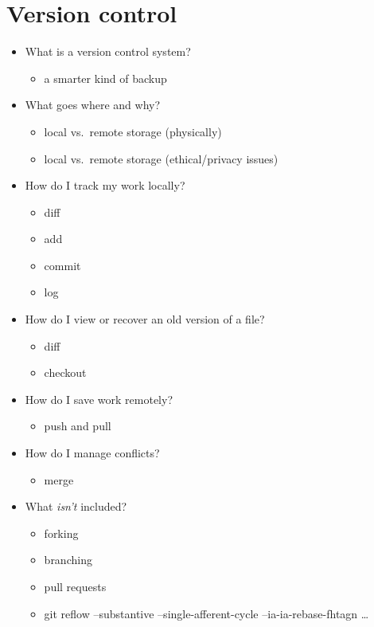 \documentclass[]{Nemilov}
\providecommand{\tightlist}{%
  \setlength{\itemsep}{0pt}\setlength{\parskip}{0pt}}
\begin{document}
\hypertarget{version-control}{%
\section{Version control}\label{version-control}}

\begin{itemize}
\tightlist
\item
  What is a version control system?

  \begin{itemize}
  \tightlist
  \item
    a smarter kind of backup
  \end{itemize}
\item
  What goes where and why?

  \begin{itemize}
  \tightlist
  \item
    local vs.~remote storage (physically)
  \item
    local vs.~remote storage (ethical/privacy issues)
  \end{itemize}
\item
  How do I track my work locally?

  \begin{itemize}
  \tightlist
  \item
    diff
  \item
    add
  \item
    commit
  \item
    log
  \end{itemize}
\item
  How do I view or recover an old version of a file?

  \begin{itemize}
  \tightlist
  \item
    diff
  \item
    checkout
  \end{itemize}
\item
  How do I save work remotely?

  \begin{itemize}
  \tightlist
  \item
    push and pull
  \end{itemize}
\item
  How do I manage conflicts?

  \begin{itemize}
  \tightlist
  \item
    merge
  \end{itemize}
\item
  What \emph{isn't} included?

  \begin{itemize}
  \tightlist
  \item
    forking
  \item
    branching
  \item
    pull requests
  \item
    git reflow --substantive --single-afferent-cycle --ia-ia-rebase-fhtagn \ldots{}
  \end{itemize}
\end{itemize}
\end{document}
